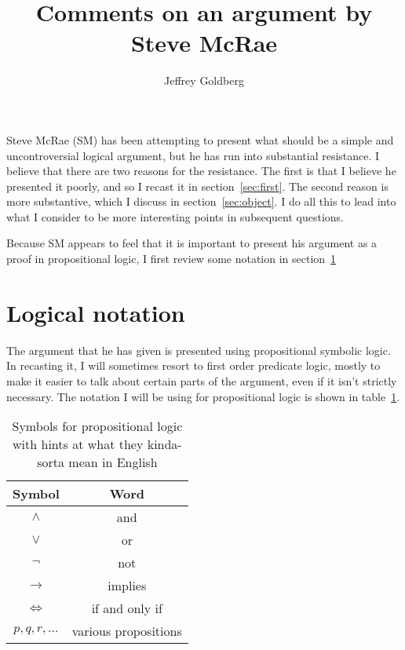 \documentclass[12pt]{article}
\title{Comments on an argument by Steve McRae}
\author{Jeffrey Goldberg}
\providecommand{\land}{\wedge}
\providecommand{\lor}{\vee}
\providecommand{\lif}{\rightarrow}
\providecommand{\liff}{\iff}
\providecommand{\lnot}{\neg}
\begin{document}
\maketitle

Steve McRae (SM) has been attempting to present what should be a simple and uncontroversial logical argument, but he has run into substantial resistance.
I believe that there are two reasons for the resistance.
The first is that I believe he presented it poorly, and so I recast it in section~\ref{sec:first}.
The second reason is more substantive, which I discuss in section~\ref{sec:object}.
I do all this to lead into what I consider to be more interesting points in subsequent questions.

Because SM appears to feel that it is important to present his argument as a proof in propositional logic, I first review some notation in section~\ref{sec:logic}

\section{Logical notation}\label{sec:logic}

The argument that he has given is presented using propositional symbolic logic.
In recasting it, I will sometimes resort to first order predicate logic, mostly to make it easier to talk about certain parts of the argument, even if it isn't strictly necessary. The notation I will be using for propositional logic is shown in table~\ref{tab:prop}. 

\begin{table}
    \begin{center}
    \begin{tabular}{cc}
        \toprule
        Symbol & Word \\
        \midrule
        $\land$ & and \\
        $\lor$  &  or \\
        $\lnot$ & not \\
        $\lif$  & implies \\
        $\liff$ & if and only if \\
        $p, q, r, \dots$ & various propositions \\
        \bottomrule  
    \end{tabular}
    \caption[Propositional logic symbols]{Symbols for propositional logic with hints at what they kinda-sorta mean in English}\label{tab:prop}
    \end{center}
\end{table}
\end{document}
